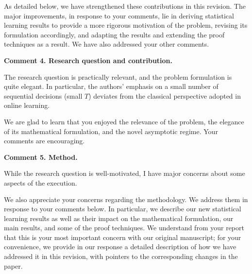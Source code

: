 \documentclass[11pt]{article}
\begin{document}
As detailed below, we have strengthened these contributions in this revision. The major improvements, in response to your comments, lie in deriving statistical learning results to provide a more rigorous motivation of the problem, revising its formulation accordingly, and adapting the results and extending the proof techniques as a result. We have also addressed your other comments.

\begin{commentBox}
\textbf{Comment 4. Research question and contribution.}\label{R1:4}

    The research question is practically relevant, and the problem formulation is quite elegant. In particular, the authors’ emphasis on a small number of sequential decisions (small $T$) deviates from the classical perspective adopted in online learning.
\end{commentBox}

We are glad to learn that you enjoyed the relevance of the problem, the elegance of its mathematical formulation, and the novel asymptotic regime. Your comments are encouraging.

\begin{commentBox}
\textbf{Comment 5. Method.}\label{R1:5}

    While the research question is well-motivated, I have major concerns about some aspects of the execution.
\end{commentBox}

We also appreciate your concerns regarding the methodology. We address them in response to your comments below. In particular, we describe our new statistical learning results as well as their impact on the mathematical formulation, our main results, and some of the proof techniques. We understand from your report that this is your most important concern with our original manuscript; for your convenience, we provide in our response a detailed description of how we have addressed it in this revision, with pointers to the corresponding changes in the paper.
\end{document}
